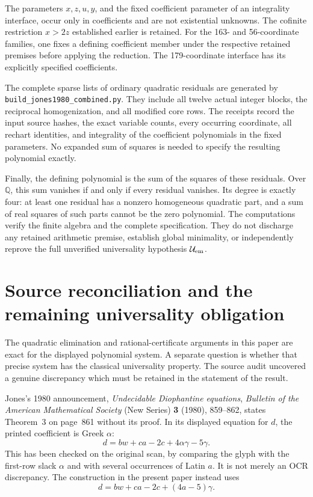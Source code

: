 \documentclass[11pt]{article}
\newcommand{\Q}{\mathbb Q}
\begin{document}
The parameters \(x,z,u,y\), and the fixed coefficient parameter of an
integrality interface, occur only in coefficients and are not existential
unknowns. The cofinite restriction \(x>2z\) established earlier is retained.
For the 163- and 56-coordinate families, one fixes a defining coefficient
member under the respective retained premises before applying the reduction.
The 179-coordinate interface has its explicitly specified coefficients.

The complete sparse lists of ordinary quadratic residuals are generated by
\nolinkurl{build_jones1980_combined.py}. They include all twelve actual
integer blocks, the reciprocal homogenization, and all modified core rows.
The receipts record the input source hashes, the exact variable counts,
every occurring coordinate, all rechart identities, and integrality of the
coefficient polynomials in the fixed parameters. No expanded sum of squares
is needed to specify the resulting polynomial exactly.

Finally, the defining polynomial is the sum of the squares of these
residuals. Over \(\Q\), this sum vanishes if and only if every residual
vanishes. Its degree is exactly four: at least one residual has a nonzero
homogeneous quadratic part, and a sum of real squares of such parts cannot
be the zero polynomial. The computations verify the finite algebra and the
complete specification. They do not discharge any retained arithmetic
premise, establish global minimality, or independently reprove the full
unverified universality hypothesis $\mathcal U_{\rm em}$.

\section{Source reconciliation and the remaining universality obligation}
\label{sec:source-reconciliation}

The quadratic elimination and rational-certificate arguments in this paper
are exact for the displayed polynomial system.  A separate question is
whether that precise system has the classical universality property.  The
source audit uncovered a genuine discrepancy which must be retained in
the statement of the result.

Jones's 1980 announcement, \emph{Undecidable Diophantine equations},
\emph{Bulletin of the American Mathematical Society} (New Series)
\textbf{3} (1980), 859--862, states Theorem~3 on page~861 without its
proof.  In its displayed equation for $d$, the printed coefficient is
Greek $\alpha$:
\[
                   d=bw+ca-2c+4\alpha\gamma-5\gamma.
\]
This has been checked on the original scan, by comparing the glyph with
the first-row slack $\alpha$ and with several occurrences of Latin $a$.
It is not merely an OCR discrepancy.  The construction in the present
paper instead uses
\begin{equation}\label{eq:emended-d}
                   d=bw+ca-2c+(4a-5)\gamma.
\end{equation}
\end{document}
